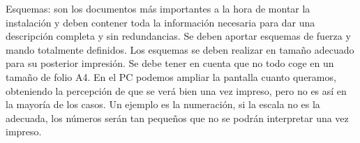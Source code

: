 \clearpage
{}
Esquemas: son los documentos más importantes a la hora de montar la instalación y deben
contener toda la información necesaria para dar una descripción completa y sin redundancias.
Se deben aportar esquemas de fuerza y mando totalmente definidos.
Los esquemas se deben realizar en tamaño adecuado para su posterior impresión. Se debe tener
en cuenta que no todo coge en un tamaño de folio A4. En el PC podemos ampliar la pantalla
cuanto queramos, obteniendo la percepción de que se verá bien una vez impreso, pero no es así
en la mayoría de los casos. Un ejemplo es la numeración, si la escala no es la adecuada, los
números serán tan pequeños que no se podrán interpretar una vez impreso.

